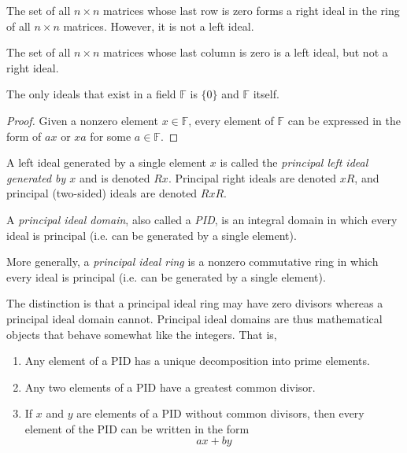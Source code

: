 \documentclass{article}
\begin{document}
    \begin{example}
      The set of all $n \times n$ matrices whose last row is zero forms a right ideal in the ring of all $n \times n$ matrices. However, it is not a left ideal.

      The set of all $n\times n$ matrices whose last column is zero is a left ideal, but not a right ideal. 
    \end{example}

    \begin{proposition}
      The only ideals that exist in a field $\mathbb{F}$ is $\{0\}$ and $\mathbb{F}$ itself. 
    \end{proposition}
    \begin{proof}
      Given a nonzero element $x \in \mathbb{F}$, every element of $\mathbb{F}$ can be expressed in the form of $a x$ or $x a$ for some $a \in \mathbb{F}$. 
    \end{proof}

    \begin{definition}
      A left ideal generated by a single element $x$ is called the \textit{principal left ideal generated by $x$} and is denoted $R x$. Principal right ideals are denoted $x R$, and principal (two-sided) ideals are denoted $R x R$. 
    \end{definition}

    \begin{definition}
      A \textit{principal ideal domain}, also called a \textit{PID}, is an integral domain in which every ideal is principal (i.e. can be generated by a single element). 

      More generally, a \textit{principal ideal ring} is a nonzero commutative ring in which every ideal is principal (i.e. can be generated by a single element). 
    \end{definition}

    The distinction is that a principal ideal ring may have zero divisors whereas a principal ideal domain cannot. Principal ideal domains are thus mathematical objects that behave somewhat like the integers. That is, 
    \begin{enumerate}
      \item Any element of a PID has a unique decomposition into prime elements. 
      \item Any two elements of a PID have a greatest common divisor. 
      \item If $x$ and $y$ are elements of a PID without common divisors, then every element of the PID can be written in the form 
      \[a x + b y\]
    \end{enumerate}
\end{document}
